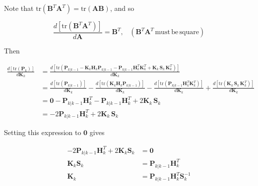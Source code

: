\documentclass[12pt]{article}
\begin{document}
Note that $\mathrm{tr}\left(\mathbf{B}^T \mathbf{A}^T\right) = \mathrm{tr}\left(\mathbf{A} \mathbf{B}\right)$,
and so

\begin{equation*}
    \frac {d \left[ \mathrm{tr} \left( \mathbf{B}^T \mathbf{A}^T \right) \right]} {d \mathbf{A}} = \mathbf{B}^T , \phantom{X} (\mathbf{B}^T \mathbf{A}^T \, \mathrm{must} \, \mathrm{be} \, \mathrm{square})
\end{equation*}

Then

\begin{equation*}
    \begin{aligned}
        \frac {d \left[ \mathrm{tr}(\mathbf{P}_k) \right]} {d \mathbf{K}_k}
        &= \frac {d \left[ \mathrm{tr} \left(
        \mathbf{P}_{k|k-1} - \mathbf{K}_k \mathbf{H}_k \mathbf{P}_{k|k-1} - \mathbf{P}_{k|k-1} \mathbf{H}_k^T \mathbf{K}_k^T
        + \mathbf{K}_k \, \mathbf{S}_k \, \mathbf{K}_k^T
        \right) \right]} {d \mathbf{K}_k} \\
        &= \frac {d \left[ \mathrm{tr} \left( \mathbf{P}_{k|k-1} \right) \right] } {d \mathbf{K}_k}
         - \frac {d \left[ \mathrm{tr} \left( \mathbf{K}_k \mathbf{H}_k \mathbf{P}_{k|k-1} \right) \right] } {d \mathbf{K}_k}
         - \frac {d \left[ \mathrm{tr} \left( \mathbf{P}_{k|k-1} \mathbf{H}_k^T \mathbf{K}_k^T \right) \right] } {d \mathbf{K}_k}
         + \frac {d \left[ \mathrm{tr} \left( \mathbf{K}_k \, \mathbf{S}_k \, \mathbf{K}_k^T \right) \right] } {d \mathbf{K}_k} \\
        &= \mathbf{0} - \mathbf{P}_{k|k-1} \mathbf{H}_k^T - \mathbf{P}_{k|k-1} \mathbf{H}_k^T + 2 \mathbf{K}_k \, \mathbf{S}_k \\
        &= - 2 \mathbf{P}_{k|k-1} \mathbf{H}_k^T + 2 \mathbf{K}_k \, \mathbf{S}_k
    \end{aligned}
\end{equation*}

Setting this expression to $\mathbf{0}$ gives

\begin{equation*}
    \begin{aligned}
        - 2 \mathbf{P}_{k|k-1} \mathbf{H}_k^T + 2 \mathbf{K}_k \mathbf{S}_k &= \mathbf{0} \\
        \mathbf{K}_k \mathbf{S}_k &= \mathbf{P}_{k|k-1} \mathbf{H}_k^T \\
        \mathbf{K}_k &= \mathbf{P}_{k|k-1} \mathbf{H}_k^T \mathbf{S}_k^{-1}
    \end{aligned}
\end{equation*}
\end{document}
